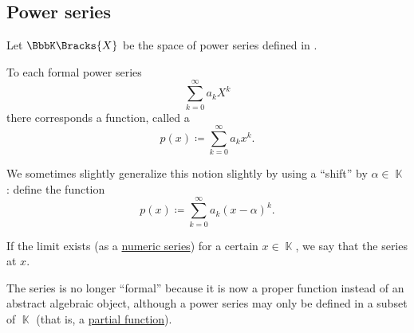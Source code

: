 \subsection{Power series}\label{subsec:power_series}

\begin{definition}\label{def:convergent_power_series}
  Let \( \BbbK\Bracks{X} \) be the space of power series defined in .

  To each formal power series
  \begin{equation*}
    \sum_{k=0}^\infty a_k X^k
  \end{equation*}
  there corresponds a function, called a 
  \begin{equation}\label{def:convergent_power_series/series}
    p(x) \coloneqq \sum_{k=0}^\infty a_k x^k.
  \end{equation}

  We sometimes slightly generalize this notion slightly by using a \enquote{shift} by \( \alpha \in \BbbK \): define the function
  \begin{equation}\label{def:convergent_power_series/shifted_series}
    p(x) \coloneqq \sum_{k=0}^\infty a_k (x - \alpha)^k.
  \end{equation}

  If the limit exists (as a \hyperref[def:convergent_series]{numeric series}) for a certain \( x \in \BbbK \), we say that the series  at \( x \).

  The series is no longer \enquote{formal} because it is now a proper function instead of an abstract algebraic object, although a power series may only be defined in a subset of \( \BbbK \) (that is, a \hyperref[def:function/partial]{partial function}).
\end{definition}

